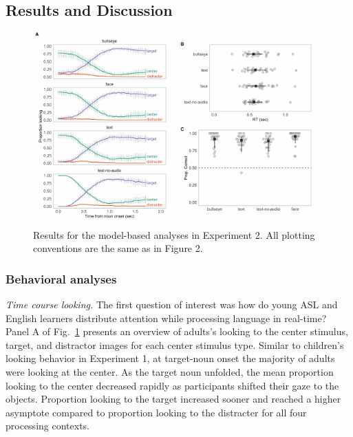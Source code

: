 \documentclass[english,floatsintext,man]{apa6}
\begin{document}
\hypertarget{results-and-discussion-1}{%
\subsection{Results and Discussion}\label{results-and-discussion-1}}

\begin{figure}[!t]

{\centering \includegraphics[width=0.85\linewidth]{figs/text-plot-1} 

}

\caption{Results for the model-based analyses in Experiment 2. All plotting conventions are the same as in Figure 2.}\label{fig:text-plot}
\end{figure}

\hypertarget{behavioral-analyses-1}{%
\subsubsection{Behavioral analyses}\label{behavioral-analyses-1}}

\emph{Time course looking.} The first question of interest was how do
young ASL and English learners distribute attention while processing
language in real-time? Panel A of Fig.~\ref{fig:text-plot} presents an
overview of adults's looking to the center stimulus, target, and
distractor images for each center stimulus type. Similar to children's
looking behavior in Experiment 1, at target-noun onset the majority of
adults were looking at the center. As the target noun unfolded, the mean
proportion looking to the center decreased rapidly as participants
shifted their gaze to the objects. Proportion looking to the target
increased sooner and reached a higher asymptote compared to proportion
looking to the distracter for all four processing contexts.
\end{document}
